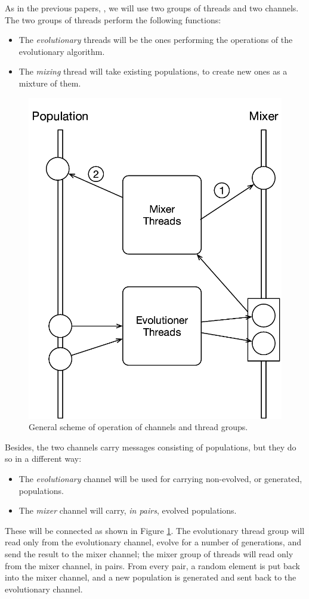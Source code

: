 \documentclass[runningheads]{llncs}\usepackage[]{graphicx}\usepackage[]{color}
\begin{document}
As in the previous papers, \cite{merelo:WEA},%
we will use two groups of threads and two channels. 
The two groups of threads perform the following functions:\begin{itemize}
\item The {\em evolutionary} threads will be the ones performing 
the operations of the evolutionary algorithm.
\item The {\em mixing} thread will take existing populations, to create
  new ones as a mixture of them.
\end{itemize}

\begin{figure}
  \vspace{-.5\intextsep}
\hspace*{-.8\columnsep}
\includegraphics[width=0.35\columnwidth]{../figure/popmixer}
\caption{General scheme of operation of channels and thread groups. }
\label{fig:scheme}
\end{figure}


Besides, the two channels carry messages consisting of populations,
but they do so in a different way:\begin{itemize}
  
\item The {\em evolutionary} channel will be used for carrying
  non-evolved, or generated, populations.
\item The {\em mixer} channel will carry, {\em in pairs}, evolved
  populations. 
\end{itemize}

These will be connected as shown in Figure \ref{fig:scheme}. The
evolutionary thread group will read only from the evolutionary channel,
evolve for a number of generations, and send the result to the mixer
channel; the mixer group of threads will read only from the mixer
channel, in pairs. From every pair, a random element is put back into
the mixer channel, and a new population is generated and sent back to
the evolutionary channel. 
\end{document}
